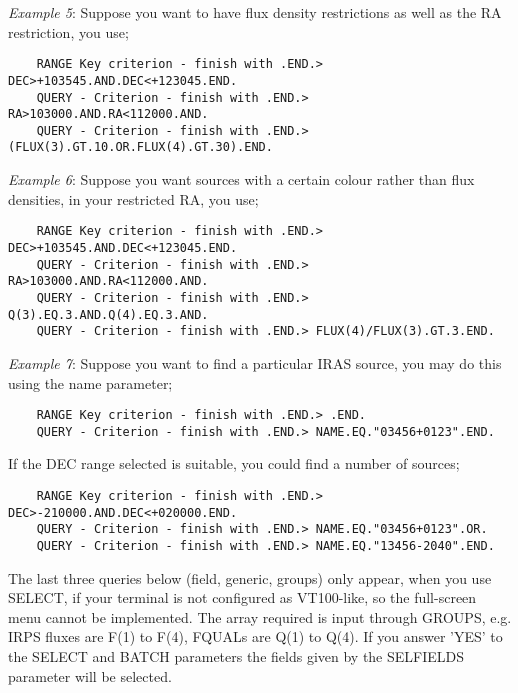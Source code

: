 {\em Example 5}: Suppose you want to have flux density restrictions as well as
the RA restriction, you use;
\begin{verbatim}
    RANGE Key criterion - finish with .END.> DEC>+103545.AND.DEC<+123045.END.
    QUERY - Criterion - finish with .END.> RA>103000.AND.RA<112000.AND.
    QUERY - Criterion - finish with .END.> (FLUX(3).GT.10.OR.FLUX(4).GT.30).END.
\end{verbatim}
{\em Example 6}: Suppose you want sources with a certain colour rather than
flux densities, in your restricted RA, you use;
\begin{verbatim}
    RANGE Key criterion - finish with .END.> DEC>+103545.AND.DEC<+123045.END.
    QUERY - Criterion - finish with .END.> RA>103000.AND.RA<112000.AND.
    QUERY - Criterion - finish with .END.> Q(3).EQ.3.AND.Q(4).EQ.3.AND. 
    QUERY - Criterion - finish with .END.> FLUX(4)/FLUX(3).GT.3.END.
\end{verbatim}
{\em Example 7}: Suppose you want to find a particular IRAS source, you may
do this using the name parameter;
\begin{verbatim}
    RANGE Key criterion - finish with .END.> .END.
    QUERY - Criterion - finish with .END.> NAME.EQ."03456+0123".END.
\end{verbatim}
If the DEC range selected is suitable, you could find a number of sources;
\begin{verbatim}
    RANGE Key criterion - finish with .END.> DEC>-210000.AND.DEC<+020000.END.
    QUERY - Criterion - finish with .END.> NAME.EQ."03456+0123".OR.
    QUERY - Criterion - finish with .END.> NAME.EQ."13456-2040".END.
\end{verbatim}

The last three queries below (field, generic, groups) only appear, when you use
SELECT, if your terminal is not configured as VT100-like, so the full-screen 
menu cannot be implemented.
The array required is input through GROUPS, e.g. IRPS fluxes are F(1) to 
F(4), FQUALs are Q(1) to Q(4).
If you answer 'YES' to the SELECT and BATCH parameters the fields given by the
SELFIELDS parameter will be selected.


